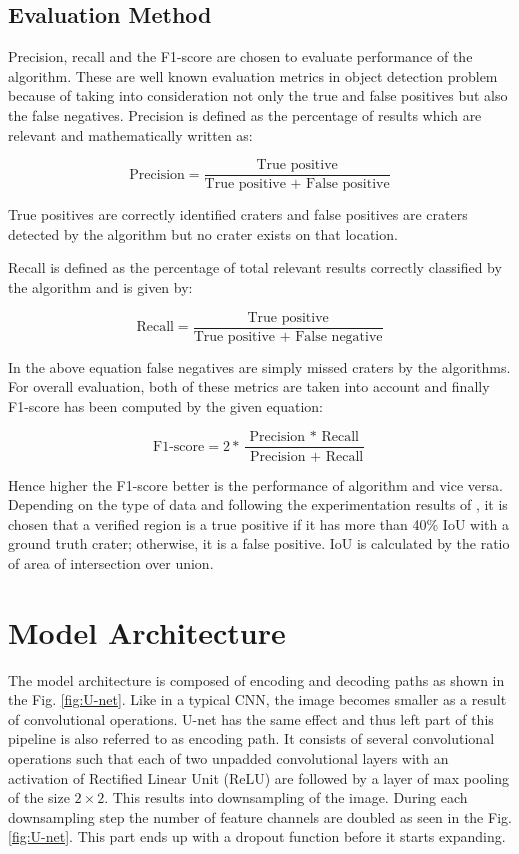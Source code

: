 \documentclass[11pt]{article}
\begin{document}
\subsection{Evaluation Method}
Precision, recall and the F1-score are chosen to evaluate performance of the algorithm. These are well known evaluation metrics in object detection problem because of taking into consideration not only the true and false positives but also the false negatives. Precision is defined as the percentage of results which are relevant and mathematically written as:

\begin{equation}
\text{Precision} = \frac{\text{True positive}}{\text{True positive + False positive}}
\label{precision}
\end{equation}

True positives are correctly identified craters and false positives are craters detected by the algorithm but no crater exists on that location.

Recall is defined as the percentage of total relevant results correctly classified by the algorithm and is given by:

\begin{equation}
\text{Recall} = \frac{\text{True positive}}{\text{True positive + False negative}}
\label{recall}
\end{equation}

In the above equation false negatives are simply missed craters by the algorithms. For overall evaluation, both of these metrics are taken into account and finally F1-score has been computed by the given equation:

\begin{equation}
\text{F1-score} =2 * \frac{\text { Precision } * \text { Recall }}{\text { Precision }+\text { Recall}}
\label{f1}
\end{equation}

Hence higher the F1-score better is the performance of algorithm and vice versa. Depending on the type of data and following the experimentation results of \cite{emami2015automatic}, it is chosen that a verified region is a true positive if it has more than 40\% IoU with a ground truth crater; otherwise, it is a false positive. IoU is calculated by the ratio of area of intersection over union.

\newpage
\section{Model Architecture}
The model architecture is composed of encoding and decoding paths as shown in the Fig. \ref{fig:U-net}. Like in a typical CNN, the image becomes smaller as a result of convolutional operations. U-net has the same effect and thus left part of this pipeline is also referred to as encoding path. It consists of several convolutional operations such that each of two unpadded convolutional layers with an activation of Rectified Linear Unit (ReLU) are followed by a layer of max pooling of the size $2\times2$. This results into downsampling of the image. During each downsampling step the number of feature channels are doubled as seen in the Fig. \ref{fig:U-net}. This part ends up with a dropout function before it starts expanding.
\end{document}
